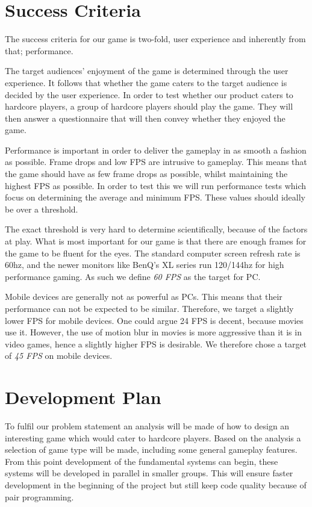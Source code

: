\section{Success Criteria}\label{successcriteria}
The success criteria for our game is two-fold, user experience and inherently from that; performance.

The target audiences' enjoyment of the game is determined through the user experience.
It follows that whether the game caters to the target audience is decided by the user experience.
In order to test whether our product caters to hardcore players, a group of hardcore players should play the game.
They will then answer a questionnaire that will then convey whether they enjoyed the game.

Performance is important in order to deliver the gameplay in as smooth a fashion as possible.
Frame drops and low FPS are intrusive to gameplay.
This means that the game should have as few frame drops as possible, whilst maintaining the highest FPS as possible.
In order to test this we will run performance tests which focus on determining the average and minimum FPS.
These values should ideally be over a threshold.

The exact threshold is very hard to determine scientifically, because of the factors at play.
What is most important for our game is that there are enough frames for the game to be fluent for the eyes.
The standard computer screen refresh rate is 60hz, and the newer monitors like BenQ's XL series run 120/144hz for high performance gaming\cite{benq}.
As such we define \textit{60 FPS} as the target for PC.

Mobile devices are generally not as powerful as PCs.
This means that their performance can not be expected to be similar.
Therefore, we target a slightly lower FPS for mobile devices.
One could argue 24 FPS is decent, because movies use it.
However, the use of motion blur in movies is more aggressive than it is in video games, hence a slightly higher FPS is desirable\cite{mobilefpsone}\cite{mobilefpstwo}.
We therefore chose a target of \textit{45 FPS} on mobile devices.

\section{Development Plan}
To fulfil our problem statement an analysis will be made of how to design an interesting game which would cater to hardcore players.
Based on the analysis a selection of game type will be made, including some general gameplay features.
From this point development of the fundamental systems can begin, these systems will be developed in parallel in smaller groups. 
This will ensure faster development in the beginning of the project but still keep code quality because of pair programming.

